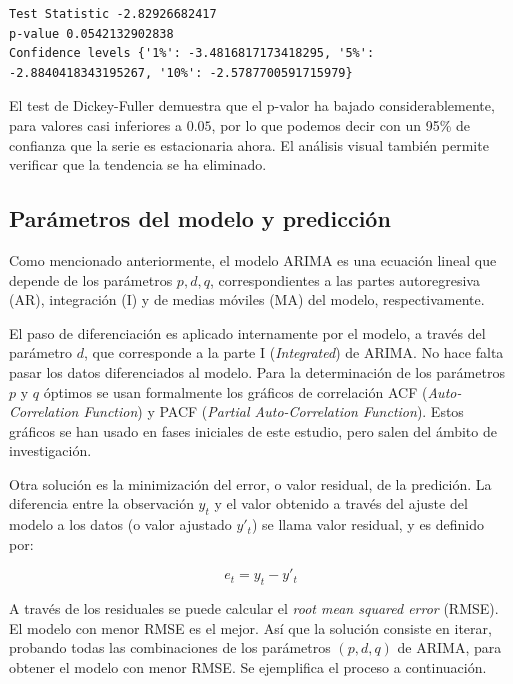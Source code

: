 \documentclass[11pt,spanish,listoffigures,listoftables]{tfgetsinf}
\begin{document}
    \begin{lstlisting}[caption=Resultados del test de Dickey-Fuller de {\tt statsmodels} de Python., label={lst:adf_test_2}]
Test Statistic -2.82926682417
p-value 0.0542132902838
Confidence levels {'1%': -3.4816817173418295, '5%': -2.8840418343195267, '10%': -2.5787700591715979}
    \end{lstlisting}
    
    El test de Dickey-Fuller demuestra que el p-valor ha bajado considerablemente, para valores casi inferiores a \(0.05\), por lo que podemos decir con un 95\% de confianza que la serie es estacionaria ahora. El análisis visual también permite verificar que la tendencia se ha eliminado.
    
    \subsection{Parámetros del modelo y predicción}
    
    Como mencionado anteriormente, el modelo ARIMA es una ecuación lineal que depende de los parámetros \(p, d, q\), correspondientes a las partes autoregresiva (AR), integración (I) y de medias móviles (MA) del modelo, respectivamente. 
    
    El paso de diferenciación es aplicado internamente por el modelo, a través del parámetro \(d\), que corresponde a la parte I ({\em Integrated}) de ARIMA. No hace falta pasar los datos diferenciados al modelo. Para la determinación de los parámetros \(p\) y \(q\) óptimos se usan formalmente los gráficos de correlación ACF ({\em Auto-Correlation Function}) y PACF ({\em Partial Auto-Correlation Function}). Estos gráficos se han usado en fases iniciales de este estudio, pero salen del ámbito de investigación. 
    
    Otra solución es la minimización del error, o valor residual, de la predición. La diferencia entre la observación \(y_{t}\) y el valor obtenido a través del ajuste del modelo a los datos (o valor ajustado \(y'_{t}\)) se llama valor residual, y es definido por:
    
    \begin{equation}
    e_{t} = y_{t} - y'_{t}
    \end{equation}
    
    A través de los residuales se puede calcular el {\em root mean squared error} (RMSE). El modelo con menor RMSE es el mejor. Así que la solución consiste en iterar, probando todas las combinaciones de los parámetros \((p,d,q)\) de ARIMA, para obtener el modelo con menor RMSE. Se ejemplifica el proceso a continuación.
    
\end{document}
